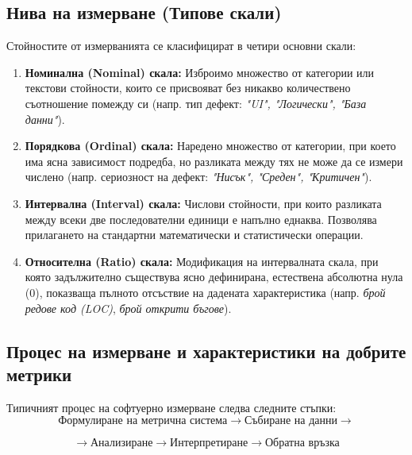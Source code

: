 \documentclass{scrartcl}
\begin{document}
\begin{FlushLeft}
\subsection{Нива на измерване (Типове скали)}
Стойностите от измерванията се класифицират в четири основни скали:
\begin{enumerate}
    \item \textbf{Номинална (Nominal) скала:} Изброимо множество от категории или текстови стойности, които се присвояват без никакво количествено съотношение помежду си (напр. тип дефект: \textit{"UI", "Логически", "База данни"}).
    \item \textbf{Порядкова (Ordinal) скала:} Наредено множество от категории, при което има ясна зависимост подредба, но разликата между тях не може да се измери числено (напр. сериозност на дефект: \textit{"Нисък", "Среден", "Критичен"}).
    \item \textbf{Интервална (Interval) скала:} Числови стойности, при които разликата между всеки две последователни единици е напълно еднаква. Позволява прилагането на стандартни математически и статистически операции.
    \item \textbf{Относителна (Ratio) скала:} Модификация на интервалната скала, при която задължително съществува ясно дефинирана, естествена абсолютна нула (0), показваща пълното отсъствие на дадената характеристика (напр. \textit{брой редове код (LOC)}, \textit{брой открити бъгове}).
\end{enumerate}

\subsection{Процес на измерване и характеристики на добрите метрики}
Типичният процес на софтуерно измерване следва следните стъпки:
\begin{equation*}
\text{Формулиране на метрична система} \longrightarrow \text{Събиране на данни} \longrightarrow
\end{equation*}

\begin{equation*}
\longrightarrow \text{Анализиране} \longrightarrow \text{Интерпретиране} \longrightarrow \text{Обратна връзка}
\end{equation*}


\end{FlushLeft}
\end{document}
